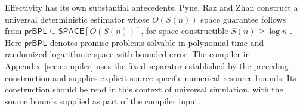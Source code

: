 Effectivity has its own substantial antecedents.
Pyne, Raz and Zhan construct a universal deterministic estimator whose
$O(S(n))$ space guarantee follows from
$\mathsf{prBPL}\subseteq\mathsf{SPACE}[O(S(n))]$, for
space-constructible $S(n)\ge\log n$
\cite[full version, Theorem~5.1]{PyneRazZhan2023}.
Here $\mathsf{prBPL}$ denotes promise problems solvable in polynomial
time and randomized logarithmic space with bounded error.
The compiler in Appendix~\ref{sec:compiler} uses the fixed separator established by the preceding construction
and supplies explicit source-specific numerical resource bounds.
Its construction should be read in this context of universal
simulation, with the source bounds supplied as part of the compiler input.

